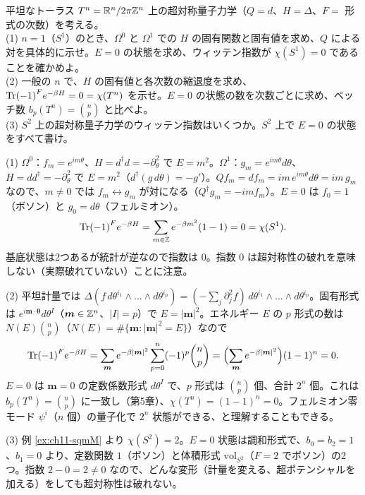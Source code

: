 \begin{problem}[難易度 B]\label{ch11-prob-torusQM}
平坦なトーラス $T^n=\mathbb{R}^n/2\pi\mathbb{Z}^n$ 上の超対称量子力学（$Q=d$、$H=\Delta$、$F=$ 形式の次数）を考える。\\
(1) $n=1$（$S^1$）のとき、$\Omega^0$ と $\Omega^1$ での $H$ の固有関数と固有値を求め、$Q$ による対を具体的に示せ。$E=0$ の状態を求め、ウィッテン指数が $\chi(S^1)=0$ であることを確かめよ。\\
(2) 一般の $n$ で、$H$ の固有値と各次数の縮退度を求め、$\Tr(-1)^Fe^{-\beta H}=0=\chi(T^n)$ を示せ。$E=0$ の状態の数を次数ごとに求め、ベッチ数 $b_p(T^n)=\binom np$ と比べよ。\\
(3) $S^2$ 上の超対称量子力学のウィッテン指数はいくつか。$S^2$ 上で $E=0$ の状態をすべて書け。
\end{problem}

\begin{solution}
(1) $\Omega^0$：$f_m=e^{im\theta}$、$H=d^\dagger d=-\partial_\theta^2$ で $E=m^2$。$\Omega^1$：$g_m=e^{im\theta}d\theta$、$H=dd^\dagger=-\partial_\theta^2$ で $E=m^2$（$d^\dagger(g\,d\theta)=-g'$）。$Q f_m=d f_m=im\,e^{im\theta}d\theta=im\,g_m$ なので、$m\neq0$ では $f_m\leftrightarrow g_m$ が対になる（$Q^\dagger g_m=-im f_m$）。$E=0$ は $f_0=1$（ボソン）と $g_0=d\theta$（フェルミオン）。
\[
\Tr(-1)^Fe^{-\beta H}=\sum_{m\in\mathbb{Z}}e^{-\beta m^2}(1-1)=0=\chi(S^1).
\]
基底状態は2つあるが統計が逆なので指数は $0$。指数 $0$ は超対称性の破れを意味しない（実際破れていない）ことに注意。

(2) 平坦計量では $\Delta(f\,d\theta^{i_1}\wedge\dots\wedge d\theta^{i_p})=(-\sum_j\partial_j^2f)\,d\theta^{i_1}\wedge\dots\wedge d\theta^{i_p}$。固有形式は $e^{i\bm m\cdot\bm\theta}d\theta^I$（$\bm m\in\mathbb{Z}^n$、$\lvert I\rvert=p$）で $E=\lvert\bm m\rvert^2$。エネルギー $E$ の $p$ 形式の数は $N(E)\binom np$（$N(E)=\#\{\bm m:\lvert\bm m\rvert^2=E\}$）なので
\[
\Tr(-1)^Fe^{-\beta H}=\sum_{\bm m}e^{-\beta\lvert\bm m\rvert^2}\sum_{p=0}^n(-1)^p\binom np=\Bigl(\sum_{\bm m}e^{-\beta\lvert\bm m\rvert^2}\Bigr)(1-1)^n=0 .
\]
$E=0$ は $\bm m=0$ の定数係数形式 $d\theta^I$ で、$p$ 形式は $\binom np$ 個、合計 $2^n$ 個。これは $b_p(T^n)=\binom np$ に一致し（第5章）、$\chi(T^n)=(1-1)^n=0$。フェルミオン零モード $\psi^i$（$n$ 個）の量子化で $2^n$ 状態ができる、と理解することもできる。

(3) 例 \ref{ex:ch11-sqmM} より $\chi(S^2)=2$。$E=0$ 状態は調和形式で、$b_0=b_2=1$、$b_1=0$ より、定数関数 $1$（ボソン）と体積形式 $\mathrm{vol}_{S^2}$（$F=2$ でボソン）の2つ。指数 $2-0=2\neq0$ なので、どんな変形（計量を変える、超ポテンシャルを加える）をしても超対称性は破れない。
\end{solution}

